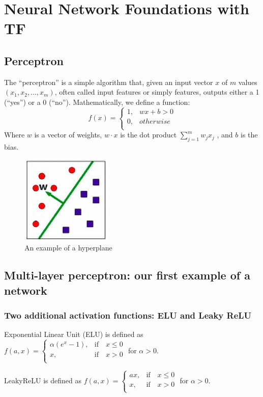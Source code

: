 \chapter{Neural Network Foundations with TF}
\section{Perceptron}
The “perceptron” is a simple algorithm that, given an input vector $x$ of $m$ values $(x_1, x_2,\dots, x_m)$, often called input features or simply features, outputs either a 1 (“yes”) or a 0 (“no”). Mathematically, we define a function:
\begin{equation}
    f(x)=\begin{cases}
        1, & wx+b>0    \\
        0, & otherwise \\
    \end{cases}
\end{equation}
Where $w$ is a vector of weights, $w\cdot x$ is the dot product $\sum_{j=1}^{m}w_jx_j$ , and $b$ is the bias.
\begin{figure}
    \centering
    \includegraphics[width=.2\textwidth]{../img/fig1-2.png}
    \caption{An example of a hyperplane}
\end{figure}

\section{Multi-layer perceptron: our first example of a network}
\subsection{Two additional activation functions: ELU and Leaky ReLU}
Exponential Linear Unit (ELU) is defined as
$
    f(a, x)=\begin{cases}
        \alpha(e^x-1), & \text{if} \quad x \leq 0 \\
        x,             & \text{if} \quad x > 0    \\
    \end{cases}
$
for $\alpha > 0$.

LeakyReLU is defined as
$
    f(a, x)=\begin{cases}
        ax, & \text{if} \quad x \leq 0 \\
        x,  & \text{if} \quad x > 0    \\
    \end{cases}
$
for $\alpha > 0$.

